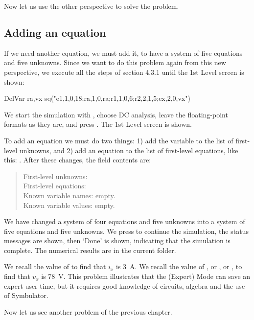 Now let us use the other perspective to solve the problem.

\subsection{Adding an equation}

If we need another equation, we must add it, to have a system of
five equations and five unknowns. Since we want to do this problem
again from this new perspective, we execute all the steps of section
4.3.1 until the 1st Level screen is shown:

\begin{entry}
DelVar ra,vx
sq\expert("e1,1,0,18;ra,1,0,ra;r1,1,0,6;r2,2,1,5;ex,2,0,vx")
\end{entry}

We start the simulation with , choose DC analysis, leave
the floating-point formats as they are, and press . The
1st Level screen is shown.

To add an equation we must do two things: 1) add the variable
 to the list of first-level unknowns, and 2) add an
equation to the list of first-level equations, like this: . After these changes, the field contents are:

\begin{quote}
First-level unknowns: \\
First-level equations: \\
Known variable names: empty.\\
Known variable values: empty.
\end{quote}

We have changed a system of four equations and five unknowns into a
system of five equations and five unknowns. We press  to
continue the simulation, the status messages are shown, then `Done'
is shown, indicating that the simulation is complete. The numerical
results are in the current folder.

We recall the value of  to find that $i_x$ is 3~A. We
recall the value of , or , or , to find
that $v_x$ is 78~V. This problem illustrates that the (Expert) Mode
can save an expert user time, but it requires good knowledge of
circuits, algebra and the use of Symbulator.

Now let us see another problem of the previous chapter.


